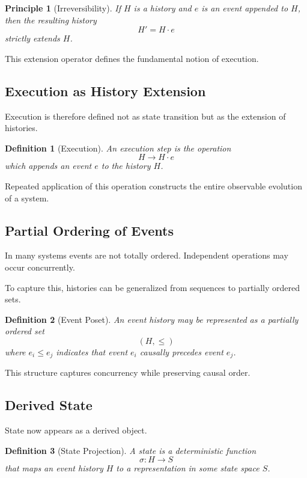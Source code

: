 \documentclass[12pt]{article}
\newtheorem{definition}{Definition}
\newtheorem{principle}{Principle}
\begin{document}
\begin{principle}[Irreversibility]
If $H$ is a history and $e$ is an event appended to $H$,
then the resulting history
\[
H' = H \cdot e
\]
strictly extends $H$.
\end{principle}

This extension operator defines the fundamental notion of execution.

\subsection{Execution as History Extension}

Execution is therefore defined not as state transition
but as the extension of histories.

\begin{definition}[Execution]
An execution step is the operation
\[
H \rightarrow H \cdot e
\]
which appends an event $e$ to the history $H$.
\end{definition}

Repeated application of this operation constructs
the entire observable evolution of a system.

\subsection{Partial Ordering of Events}

In many systems events are not totally ordered.
Independent operations may occur concurrently.

To capture this, histories can be generalized from sequences
to partially ordered sets.

\begin{definition}[Event Poset]
An event history may be represented as a partially ordered set
\[
(H, \leq)
\]
where $e_i \leq e_j$ indicates that event $e_i$
causally precedes event $e_j$.
\end{definition}

This structure captures concurrency while preserving causal order.

\subsection{Derived State}

State now appears as a derived object.

\begin{definition}[State Projection]
A \emph{state} is a deterministic function
\[
\sigma : H \rightarrow S
\]
that maps an event history $H$ to a representation
in some state space $S$.
\end{definition}
\end{document}
